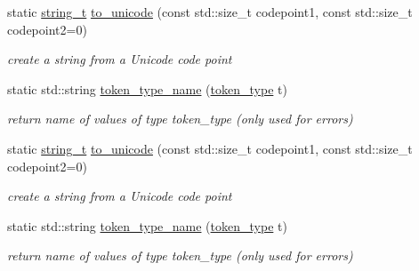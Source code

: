 \begin{DoxyCompactItemize}
\item 
static \hyperlink{classnlohmann_1_1basic__json_ab63e618bbb0371042b1bec17f5891f42_ab63e618bbb0371042b1bec17f5891f42}{string\-\_\-t} \hyperlink{classnlohmann_1_1basic__json_1_1lexer_aaba589becdcea269f271466f73dbf08b_aaba589becdcea269f271466f73dbf08b}{to\-\_\-unicode} (const std\-::size\-\_\-t codepoint1, const std\-::size\-\_\-t codepoint2=0)
\begin{DoxyCompactList}\small\item\em create a string from a Unicode code point \end{DoxyCompactList}\item 
\hypertarget{classnlohmann_1_1basic__json_1_1lexer_a60ae71e0b684c04b9f3e5c14e31af422_a60ae71e0b684c04b9f3e5c14e31af422}{static std\-::string \hyperlink{classnlohmann_1_1basic__json_1_1lexer_a60ae71e0b684c04b9f3e5c14e31af422_a60ae71e0b684c04b9f3e5c14e31af422}{token\-\_\-type\-\_\-name} (\hyperlink{classnlohmann_1_1basic__json_1_1lexer_a96887d6cd131e3d3a85a9d71fbdbcdf7_a96887d6cd131e3d3a85a9d71fbdbcdf7}{token\-\_\-type} t)}\label{classnlohmann_1_1basic__json_1_1lexer_a60ae71e0b684c04b9f3e5c14e31af422_a60ae71e0b684c04b9f3e5c14e31af422}

\begin{DoxyCompactList}\small\item\em return name of values of type token\-\_\-type (only used for errors) \end{DoxyCompactList}\item 
static \hyperlink{classnlohmann_1_1basic__json_ab63e618bbb0371042b1bec17f5891f42_ab63e618bbb0371042b1bec17f5891f42}{string\-\_\-t} \hyperlink{classnlohmann_1_1basic__json_1_1lexer_aaba589becdcea269f271466f73dbf08b_aaba589becdcea269f271466f73dbf08b}{to\-\_\-unicode} (const std\-::size\-\_\-t codepoint1, const std\-::size\-\_\-t codepoint2=0)
\begin{DoxyCompactList}\small\item\em create a string from a Unicode code point \end{DoxyCompactList}\item 
\hypertarget{classnlohmann_1_1basic__json_1_1lexer_a60ae71e0b684c04b9f3e5c14e31af422_a60ae71e0b684c04b9f3e5c14e31af422}{static std\-::string \hyperlink{classnlohmann_1_1basic__json_1_1lexer_a60ae71e0b684c04b9f3e5c14e31af422_a60ae71e0b684c04b9f3e5c14e31af422}{token\-\_\-type\-\_\-name} (\hyperlink{classnlohmann_1_1basic__json_1_1lexer_a96887d6cd131e3d3a85a9d71fbdbcdf7_a96887d6cd131e3d3a85a9d71fbdbcdf7}{token\-\_\-type} t)}\label{classnlohmann_1_1basic__json_1_1lexer_a60ae71e0b684c04b9f3e5c14e31af422_a60ae71e0b684c04b9f3e5c14e31af422}

\begin{DoxyCompactList}\small\item\em return name of values of type token\-\_\-type (only used for errors) \end{DoxyCompactList}\end{DoxyCompactItemize}
